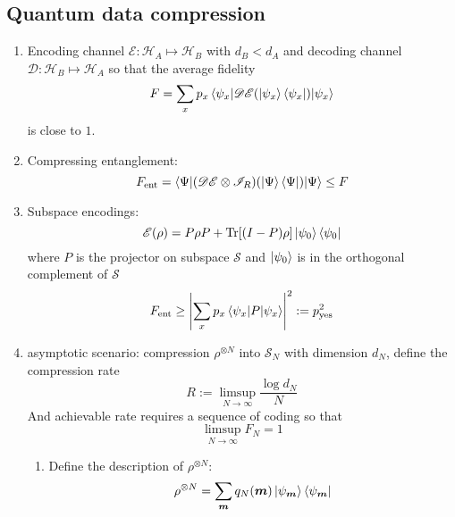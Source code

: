 \documentclass[11pt,a4paper]{article}%
\numberwithin{equation}{section}
\renewcommand*{\vec}[1]{\bm{#1}}%
\newcommand{\Tr}{\operatorname{Tr}}
\begin{document}
\subsection{Quantum data compression} %
\label{sub:quantum_data_compression}
\begin{enumerate}
    \item Encoding channel $\mathscr E: \mathcal H_A \mapsto \mathcal H_B$ with $d_B<d_A$ and decoding channel $\mathscr D:\mathcal H_B \mapsto\mathcal H_A$ so that the average fidelity 
    \begin{equation}
        F = \sum_x p_x\braket{\psi_x|\mathscr D\mathscr E(\ket{\psi_x}\bra{\psi_x})|\psi_x}
    \end{equation}
    is close to $1$.
    \item Compressing entanglement:
    \begin{equation}
        F_{\mathrm{ent}} = \braket{\Psi|(\mathscr D\mathscr E\otimes\mathscr I_R)(\ket\Psi\bra\Psi)|\Psi}\le F
    \end{equation}
    \item Subspace encodings:
    \begin{equation}
        \mathscr E(\rho) = P\rho P + \Tr[(I-P)\rho]\ket{\psi_0}\bra{\psi_0}
    \end{equation}
    where $P$ is the projector on subspace $\mathcal S$ and $\ket{\psi_0}$ is in the orthogonal complement of $\mathcal S$
    \begin{equation}
        F_{\mathrm{ent}}\ge\left|\sum_xp_x\braket{\psi_x|P|\psi_x}\right|^2 := p_{\mathrm{yes}}^2
    \end{equation}
    \item asymptotic scenario: compression $\rho^{\otimes N}$ into $\mathcal S_N$ with dimension $d_N$, define the compression rate
    \begin{equation}
        R:=\limsup_{N\to\infty}\frac{\log d_N}N
    \end{equation}
    And achievable rate requires a sequence of coding so that
    \begin{equation}
        \limsup_{N\to\infty}F_N = 1
    \end{equation}
    \begin{enumerate}
        \item Define the description of $\rho^{\otimes N}$:
        \begin{equation}
            \rho^{\otimes N} = \sum_{\vec m}q_N(\vec m)\ket{\psi_{\vec m}}\bra{\psi_{\vec m}}
        \end{equation}

\end{enumerate}
\end{enumerate}
\end{document}
